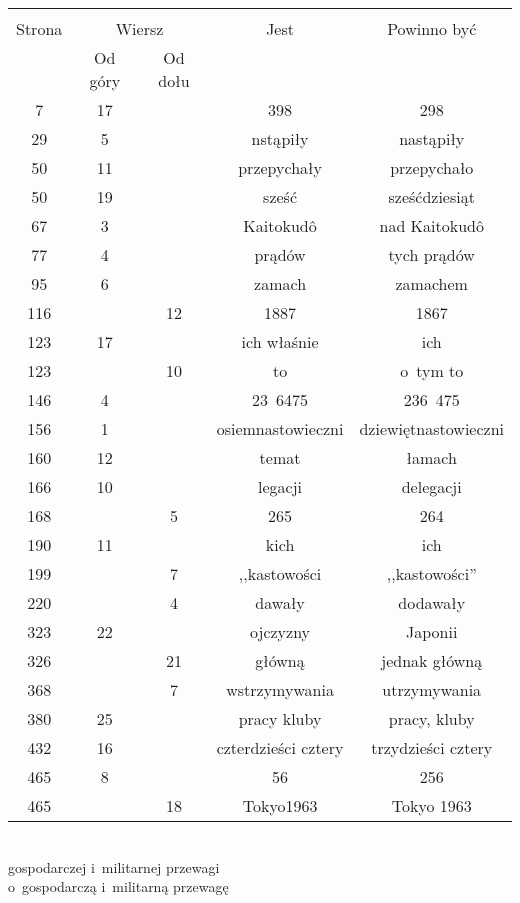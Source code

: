\documentclass[a4paper,11pt]{article}
\begin{document}
\begin{center}
  \begin{tabular}{|c|c|c|c|c|}
    \hline
    & \multicolumn{2}{c|}{} & & \\
    Strona & \multicolumn{2}{c|}{Wiersz} & Jest
                              & Powinno być \\ \cline{2-3}
    & Od góry & Od dołu & & \\
    \hline
    7   & 17 & & 398 & 298 \\
    29  &  5 & & nstąpiły & nastąpiły \\
    50  & 11 & & przepychały & przepychało \\
    50  & 19 & & sześć & sześćdziesiąt \\
    67  &  3 & & Kaitokud\^{o} & nad Kaitokud\^{o} \\
    77  &  4 & & prądów & tych prądów \\
    95  &  6 & & zamach & zamachem \\
    116 & & 12 & 1887 & 1867 \\
    123 & 17 & & ich właśnie & ich \\
    123 & & 10 & to & o~tym to \\
    146 &  4 & & 23~6475 & 236~475 \\
    156 &  1 & & osiemnastowieczni & dziewiętnastowieczni \\
    160 & 12 & & temat & łamach \\
    166 & 10 & & legacji & delegacji \\
    168 & & 5 & 265 & 264 \\
    190 & 11 & & kich & ich \\
    199 & & 7 & ,,kastowości  %
           & ,,kastowości'' \\
    220 & &  4 & dawały & dodawały \\
    323 & 22 & & ojczyzny & Japonii \\
    326 & & 21 & główną & jednak główną \\
    368 & &  7 & wstrzymywania & utrzymywania \\
    380 & 25 & & pracy kluby & pracy, kluby \\
    432 & 16 & & czterdzieści cztery & trzydzieści cztery \\
    465 &  8 & & 56 & 256 \\
    465 & & 18 & Tokyo1963 & Tokyo 1963 \\
    \hline
  \end{tabular}
\end{center}
\noi
{} \\
\Jest gospodarczej i~militarnej przewagi \\
\Pow  o~gospodarczą i~militarną przewagę \\
\end{document}
